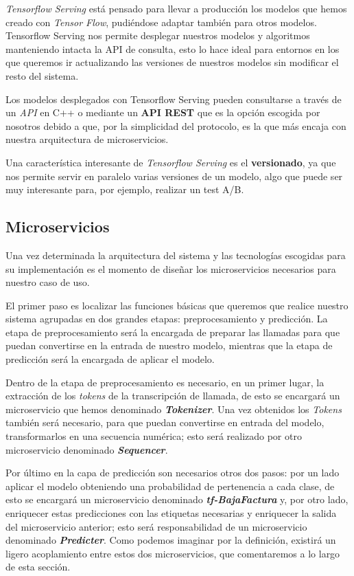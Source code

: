 \textit{Tensorflow Serving} \cite{tfserving} está pensado para llevar a producción los modelos que hemos creado con \textit{Tensor Flow}, pudiéndose adaptar también para otros modelos. Tensorflow Serving nos permite desplegar nuestros modelos y algoritmos manteniendo intacta la API de consulta, esto lo hace ideal para entornos en los que queremos ir actualizando las versiones de nuestros modelos sin modificar el resto del sistema.

Los modelos desplegados con Tensorflow Serving pueden consultarse a través de un \textit{API} en C++ o mediante un \textbf{API REST} que es la opción escogida por nosotros debido a que, por la simplicidad del protocolo, es la que más encaja con nuestra arquitectura de microservicios. 

Una característica interesante de \textit{Tensorflow Serving}  es el \textbf{versionado}, ya que nos permite servir en paralelo varias versiones de un modelo, algo que puede ser muy interesante para, por ejemplo, realizar un test A/B.





\subsection{Microservicios}

Una vez determinada la arquitectura del sistema y las tecnologías escogidas para su implementación es el momento de diseñar los microservicios necesarios para nuestro caso de uso.

El primer paso es localizar las funciones básicas que queremos que realice nuestro sistema agrupadas en dos grandes etapas: preprocesamiento y predicción. La etapa de preprocesamiento será la encargada de preparar las llamadas para que puedan convertirse en la entrada de nuestro modelo, mientras que la etapa de predicción será la encargada de aplicar el modelo. 

Dentro de la etapa de preprocesamiento es necesario, en un primer lugar, la extracción de los \textit{tokens} de la transcripción de llamada, de esto se encargará un microservicio que hemos denominado \textit{\textbf{Tokenizer}}. Una vez obtenidos los \textit{Tokens} también será necesario, para que puedan convertirse en entrada del modelo, transformarlos en una secuencia numérica; esto será realizado por otro microservicio denominado \textit{\textbf{Sequencer}}.

Por último en la capa de predicción son necesarios otros dos pasos: por un lado aplicar el modelo  obteniendo una probabilidad de pertenencia a cada clase, de esto se encargará un microservicio denominado \textbf{\textit{tf-BajaFactura}} y, por otro lado, enriquecer estas predicciones con las etiquetas necesarias y enriquecer la salida del microservicio anterior; esto será responsabilidad de un microservicio denominado \textbf{\textit{Predicter}}. Como podemos imaginar por la definición, existirá un ligero acoplamiento entre estos dos microservicios, que comentaremos a lo largo de esta sección.
\vspace{0.2cm}


